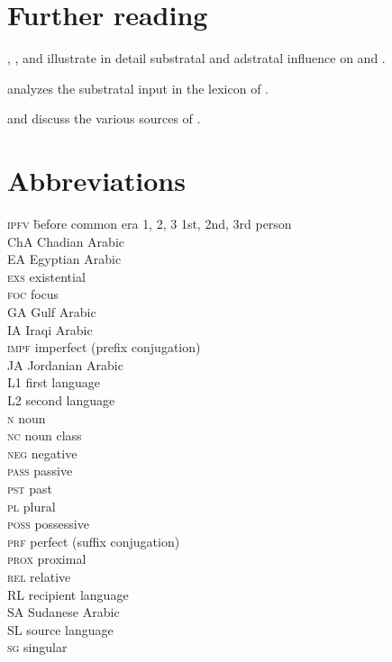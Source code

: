 \documentclass[output=paper]{langsci/langscibook}
\begin{document}
\section*{Further reading}
\begin{furtherreading}
\item[\citet{Miller1993}, \citet{Nakao2012}, and \citet{Luffin2014}] illustrate in detail substratal and adstratal influence on   and .
\item[\citet{Avram2019}] analyzes the substratal input in the lexicon of .
\item[\citet{Avram2017article} and \citet{Bakir2017}] discuss the various sources of .
\end{furtherreading}

\section*{Abbreviations}
\setlength{\columnsep}{30pt}
\begin{multicols}{2}
\begin{tabbing}
\textsc{ipfv} \hspace{1em} \= before common era\kill
\textsc{1, 2, 3} \> 1st, 2nd, 3rd person \\
{ChA} \> {Chadian} {Arabic} \\
{EA} \> {Egyptian Arabic} \\
\textsc{exs} \> {existential} \\
\textsc{foc} \> focus \\
{GA} \> Gulf Arabic \\
{IA} \> {Iraqi} {Arabic} \\
\textsc{impf} \> imperfect (prefix conjugation) \\
{JA} \> {Jordanian} {Arabic} \\
L1 \> first language\\
L2 \> second language\\
\textsc{n} \> noun \\
\textsc{nc} \> noun class \\
\textsc{neg} \> negative \\
\textsc{pass} \> {passive} \\
\textsc{pst} \> past \\
\textsc{pl} \> plural \\
\textsc{poss} \> possessive \\
\textsc{prf} \> perfect (suffix conjugation) \\
\textsc{prox} \> proximal \\
\textsc{rel} \> {relative} \\
{RL} \> {recipient language} \\
SA \> {Sudanese} {Arabic} \\
{SL} \> {source language} \\
\textsc{sg} \> singular
\end{tabbing}
\end{multicols}


\sloppy\printbibliography[heading=subbibliography,notkeyword=this]
\end{document}
